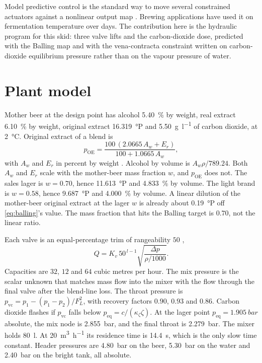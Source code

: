 \documentclass[11pt,a4paper]{article}
\begin{document}
Model predictive control is the standard way to move several constrained actuators against a nonlinear output map \citep{qin2003,rawlings2017}. Brewing applications have used it on fermentation temperature over days. The contribution here is the hydraulic program for this skid: three valve lifts and the carbon-dioxide dose, predicted with the Balling map and with the vena-contracta constraint written on carbon-dioxide equilibrium pressure rather than on the vapour pressure of water.

\section{Plant model}
Mother beer at the design point has alcohol \SI{5.40}{\percent} by weight, real extract \SI{6.10}{\percent} by weight, original extract \SI{16.319}{\degree}P and \SI{5.50}{\gram\per\litre} of carbon dioxide, at \SI{2}{\celsius}. Original extract of a blend is
\begin{equation}
p_{\mathrm{OE}}
=
\frac{100\,(2.0665\,A_w + E_r)}{100 + 1.0665\,A_w},
\label{eq:balling}
\end{equation}
with $A_w$ and $E_r$ in percent by weight \citep{kunze2019}. Alcohol by volume is $A_w\rho/789.24$. Both $A_w$ and $E_r$ scale with the mother-beer mass fraction $w$, and $p_{\mathrm{OE}}$ does not. The sales lager is $w=0.70$, hence \SI{11.613}{\degree}P and \SI{4.833}{\percent} by volume. The light brand is $w=0.58$, hence \SI{9.687}{\degree}P and \SI{4.000}{\percent} by volume. A linear dilution of the mother-beer original extract at the lager $w$ is already about \SI{0.19}{\degree}P off \eqref{eq:balling}'s value. The mass fraction that hits the Balling target is $0.70$, not the linear ratio.

Each valve is an equal-percentage trim of rangeability $50$ \citep{iec60534},
\begin{equation}
Q = K_v\,50^{\,l-1}\sqrt{\frac{\Delta p}{\rho/1000}}.
\end{equation}
Capacities are $32$, $12$ and $64$ cubic metres per hour. The mix pressure is the scalar unknown that matches mass flow into the mixer with the flow through the final valve after the blend-line loss. The throat pressure is $p_{\mathrm{vc}}=p_1-(p_1-p_2)/F_L^2$, with recovery factors $0.90$, $0.93$ and $0.86$. Carbon dioxide flashes if $p_{\mathrm{vc}}$ falls below $p_{\mathrm{eq}}=c/(\kappa_\zeta\zeta)$. At the lager point $p_{\mathrm{eq}}=\SI{1.905}{bar}$ absolute, the mix node is \SI{2.855}{bar}, and the final throat is \SI{2.279}{bar}. The mixer holds \SI{80}{\litre}. At \SI{20}{\cubic\metre\per\hour} its residence time is \SI{14.4}{\second}, which is the only slow time constant. Header pressures are \SI{4.80}{bar} on the beer, \SI{5.30}{bar} on the water and \SI{2.40}{bar} on the bright tank, all absolute.
\end{document}

